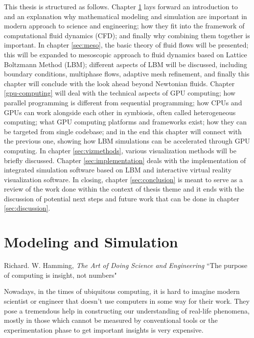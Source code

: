 This thesis is structured as follows. Chapter \ref{sec:modsim} lays forward an introduction to and an explanation why mathematical modeling and simulation are important in modern approach to science and engineering; how they fit into the framework of computational fluid dynamics (CFD); and finally why combining them together is important. In chapter \ref{sec:meso}, the basic theory of fluid flows will be presented; this will be expanded to mesoscopic approach to fluid dynamics based on Lattice Boltzmann Method (LBM); different aspects of LBM will be discussed, including boundary conditions, multiphase flows, adaptive mesh refinement, and finally this chapter will conclude with the look ahead beyond Newtonian fluids. Chapter \ref{gpu-computing} will deal with the technical aspects of GPU computing; how parallel programming is different from sequential programming; how CPUs and GPUs can work alongside each other in symbiosis, often called heterogeneous computing; what GPU computing platforms and frameworks exist; how they can be targeted from single codebase; and in the end this chapter will connect with the previous one, showing how LBM simulations can be accelerated through GPU computing. In chapter \ref{sec:vizmethods}, various visualization methods will be briefly discussed. Chapter \ref{sec:implementation} deals with the implementation of integrated simulation software based on LBM and interactive virtual reality visualization software. In closing, chapter \ref{sec:conclusion} is meant to serve as a review of the work done within the context of thesis theme and it ends with the discussion of potential next steps and future work that can be done in chapter \ref{sec:discussion}.


\section{Modeling and Simulation}\label{sec:modsim}
\begin{chapquote}{Richard. W. Hamming, \textit{The Art of Doing Science and Engineering}}
``The purpose of computing is insight, not numbers"
\end{chapquote}

Nowadays, in the times of ubiquitous computing, it is hard to imagine modern scientist or engineer that doesn't use computers in some way for their work. They pose a tremendous help in constructing our understanding of real-life phenomena, mostly in those which cannot be measured by conventional tools or the experimentation phase to get important insights is very expensive.

